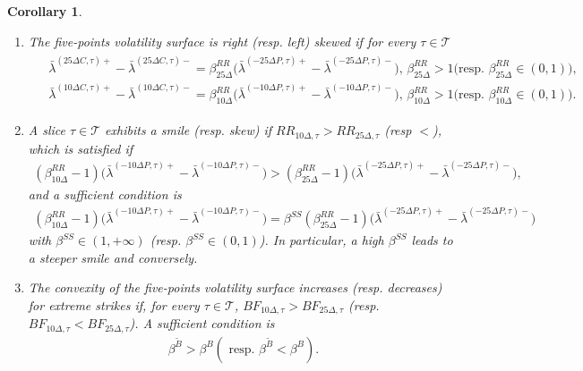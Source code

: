 \documentclass[12pt]{article}
\newtheorem{corollary}[theorem2]{Corollary}
\begin{document}
\begin{corollary}\label{corollary_5points}\leavevmode
\begin{enumerate}
    \item The five-points volatility surface is right (resp. left) skewed if for every $\tau\in\mathcal{T}$
\begin{align*}%
\begin{split}
    & \bar \lambda^{(25\Delta C,\tau)+}-\bar \lambda^{(25\Delta C,\tau)-} \!\!=\! \beta^{RR}_{25\Delta}\big( \bar \lambda^{(-25\Delta P,\tau)+}-\bar \lambda^{(-25\Delta P,\tau)-}\big), \, \beta^{RR}_{25\Delta}>1 \big(\text{resp. } \beta^{RR}_{25\Delta}\in(0,1)\big), \\
    & \bar \lambda^{(10\Delta C,\tau)+}-\bar \lambda^{(10\Delta C,\tau)-} \!\!=\! \beta^{RR}_{10\Delta}\big( \bar \lambda^{(-10\Delta P,\tau)+}-\bar \lambda^{(-10\Delta P,\tau)-}\big), \, \beta^{RR}_{10\Delta}>1 \big(\text{resp. } \beta^{RR}_{10\Delta}\in(0,1)\big).    
\end{split}
\end{align*}
    \item A slice $\tau\in \mathcal{T}$ exhibits a smile (resp. skew) if $RR_{10\Delta,\tau}>RR_{25\Delta,\tau}$ (resp $<$), which is satisfied if
\begin{align*}
    (\beta^{RR}_{10\Delta}-1)\big( \bar \lambda^{(-10\Delta P,\tau)+}-\bar \lambda^{(-10\Delta P,\tau)-}\big) > (\beta^{RR}_{25\Delta}-1)\big( \bar \lambda^{(-25\Delta P,\tau)+}-\bar \lambda^{(-25\Delta P,\tau)-}\big),
\end{align*}
and a sufficient condition is
\begin{align*}%
    (\beta^{RR}_{10\Delta}-1)\big( \bar \lambda^{(-10\Delta P,\tau)+}-\bar \lambda^{(-10\Delta P,\tau)-}\big) = \beta^{SS} (\beta^{RR}_{25\Delta}-1)\big( \bar \lambda^{(-25\Delta P,\tau)+}-\bar \lambda^{(-25\Delta P,\tau)-}\big) 
\end{align*}
with $\beta^{SS}\in (1,+\infty)$ (resp. $\beta^{SS}\in (0,1)$). In particular, a high $\beta^{SS}$ leads to a steeper smile and conversely. 
    \item The convexity of the five-points volatility surface increases (resp. decreases) for extreme strikes if, for every $\tau\in\mathcal{T}$, $BF_{10\Delta,\tau}>BF_{25\Delta,\tau}$ (resp.  $BF_{10\Delta,\tau}<BF_{25\Delta,\tau}$). A sufficient condition is 
\begin{align*}
    \beta^{\tilde{B}}> \beta^B (\text{ resp. }\beta^{\tilde{B}}< \beta^B).
\end{align*}
\end{enumerate}
\end{corollary}
\end{document}
